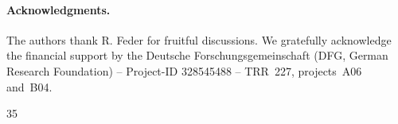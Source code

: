 \documentclass[prl,twocolumn,floatfix,superscriptaddress,aps]{revtex4-2}
\begin{document}
\paragraph{Acknowledgments.} 
The authors thank R. Feder for fruitful discussions. We gratefully acknowledge the financial support by the Deutsche Forschungsgemeinschaft (DFG, German Research Foundation) -- Project-ID 328545488 -- TRR~227, projects~A06 and~B04.

\begin{thebibliography}{35}%
    \makeatletter
    \providecommand \@ifxundefined [1]{%
     \@ifx{#1\undefined}
    }%
    \providecommand \@ifnum [1]{%
     \ifnum #1\expandafter \@firstoftwo
     \else \expandafter \@secondoftwo
     \fi
    }%
    \providecommand \@ifx [1]{%
     \ifx #1\expandafter \@firstoftwo
     \else \expandafter \@secondoftwo
     \fi
    }%
    \providecommand \natexlab [1]{#1}%
    \providecommand \enquote  [1]{``#1''}%
    \providecommand \bibnamefont  [1]{#1}%
    \providecommand \bibfnamefont [1]{#1}%
    \providecommand \citenamefont [1]{#1}%
    \providecommand \href@noop [0]{\@secondoftwo}%
    \providecommand \href [0]{\begingroup \@sanitize@url \@href}%
    \providecommand \@href[1]{\@@startlink{#1}\@@href}%
    \providecommand \@@href[1]{\endgroup#1\@@endlink}%
    \providecommand \@sanitize@url [0]{\catcode `\\12\catcode `\$12\catcode
      `\&12\catcode `\#12\catcode `\^12\catcode `\_12\catcode `\%12\relax}%
    \providecommand \@@startlink[1]{}%
    \providecommand \@@endlink[0]{}%
    \providecommand \url  [0]{\begingroup\@sanitize@url \@url }%
    \providecommand \@url [1]{\endgroup\@href {#1}{\urlprefix }}%
    \providecommand \urlprefix  [0]{URL }%
    \providecommand \Eprint [0]{\href }%
    \providecommand \doibase [0]{https://doi.org/}%
    \providecommand \selectlanguage [0]{\@gobble}%
    \providecommand \bibinfo  [0]{\@secondoftwo}%
    \providecommand \bibfield  [0]{\@secondoftwo}%
    \providecommand \translation [1]{[#1]}%
    \providecommand \BibitemOpen [0]{}%
    \providecommand \bibitemStop [0]{}%
    \providecommand \bibitemNoStop [0]{.\EOS\space}%
    \providecommand \EOS [0]{\spacefactor3000\relax}%
    \providecommand \BibitemShut  [1]{\csname bibitem#1\endcsname}%

\end{thebibliography}
\end{document}
